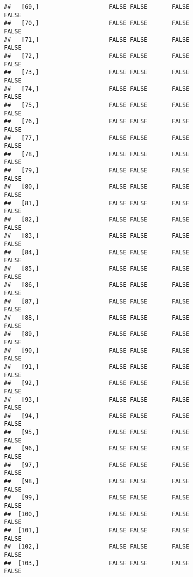 \documentclass[
]{article}
\begin{document}
\begin{verbatim}
##   [69,]                    FALSE FALSE       FALSE                FALSE
##   [70,]                    FALSE FALSE       FALSE                FALSE
##   [71,]                    FALSE FALSE       FALSE                FALSE
##   [72,]                    FALSE FALSE       FALSE                FALSE
##   [73,]                    FALSE FALSE       FALSE                FALSE
##   [74,]                    FALSE FALSE       FALSE                FALSE
##   [75,]                    FALSE FALSE       FALSE                FALSE
##   [76,]                    FALSE FALSE       FALSE                FALSE
##   [77,]                    FALSE FALSE       FALSE                FALSE
##   [78,]                    FALSE FALSE       FALSE                FALSE
##   [79,]                    FALSE FALSE       FALSE                FALSE
##   [80,]                    FALSE FALSE       FALSE                FALSE
##   [81,]                    FALSE FALSE       FALSE                FALSE
##   [82,]                    FALSE FALSE       FALSE                FALSE
##   [83,]                    FALSE FALSE       FALSE                FALSE
##   [84,]                    FALSE FALSE       FALSE                FALSE
##   [85,]                    FALSE FALSE       FALSE                FALSE
##   [86,]                    FALSE FALSE       FALSE                FALSE
##   [87,]                    FALSE FALSE       FALSE                FALSE
##   [88,]                    FALSE FALSE       FALSE                FALSE
##   [89,]                    FALSE FALSE       FALSE                FALSE
##   [90,]                    FALSE FALSE       FALSE                FALSE
##   [91,]                    FALSE FALSE       FALSE                FALSE
##   [92,]                    FALSE FALSE       FALSE                FALSE
##   [93,]                    FALSE FALSE       FALSE                FALSE
##   [94,]                    FALSE FALSE       FALSE                FALSE
##   [95,]                    FALSE FALSE       FALSE                FALSE
##   [96,]                    FALSE FALSE       FALSE                FALSE
##   [97,]                    FALSE FALSE       FALSE                FALSE
##   [98,]                    FALSE FALSE       FALSE                FALSE
##   [99,]                    FALSE FALSE       FALSE                FALSE
##  [100,]                    FALSE FALSE       FALSE                FALSE
##  [101,]                    FALSE FALSE       FALSE                FALSE
##  [102,]                    FALSE FALSE       FALSE                FALSE
##  [103,]                    FALSE FALSE       FALSE                FALSE

\end{verbatim}
\end{document}
